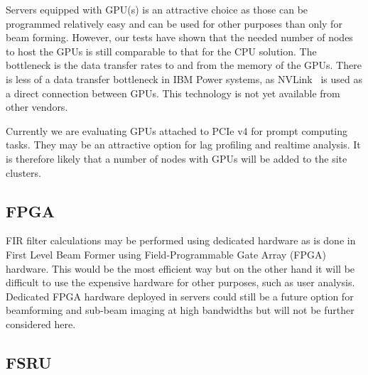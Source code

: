 \documentclass[12pt,a4paper]{article}
\begin{document}
Servers equipped with GPU(s) is an attractive choice as those can be programmed relatively easy and can be used for other purposes than only for beam forming. 
However, our tests have shown that the needed number of nodes to host the GPUs is still comparable to that for the CPU solution. 
The bottleneck is the data transfer rates to and from the memory of the GPUs.  
There is less of a data transfer bottleneck in IBM Power systems, as NVLink~\cite{nvlink} is used as a direct connection between GPUs.
This technology is not yet available from other vendors.

Currently we are evaluating GPUs attached to PCIe v4 for prompt computing tasks. They may be an attractive option for lag profiling and realtime analysis. It is therefore likely that a number of nodes with GPUs will be added to the site clusters.


\subsection{FPGA}

FIR filter calculations may be performed using dedicated hardware as is done in First Level Beam Former using Field-Programmable Gate Array (FPGA) hardware.  This would be the most efficient way but on the other hand it will be difficult to use the expensive hardware for other purposes, such as user analysis. 
Dedicated FPGA hardware deployed in servers could still be a future option for beamforming and sub-beam imaging at high bandwidths but will not be further considered here.

\subsection{FSRU}
\label{ssec-fsru}
\end{document}
